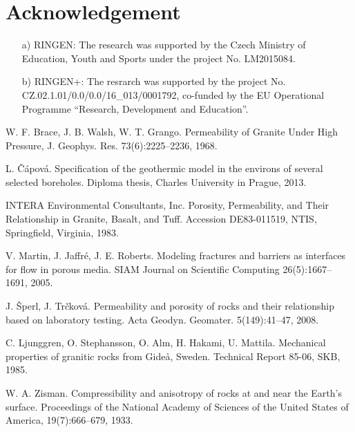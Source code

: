 \documentclass{article}
\begin{document}
\section*{Acknowledgement}
\begin{itemize}
    \item[a)] RINGEN:
    The research was supported by the Czech Ministry of Education, Youth and Sports under the project No. LM2015084.
 
    \item[b)] RINGEN+:
    The resrarch was supported by the project No. CZ.02.1.01/0.0/0.0/16\_013/0001792, co-funded by the EU Operational Programme ``Research, Development and Education''.
\end{itemize}


\begin{thebibliography}{9}

 W. F. Brace,  J. B. Walsh, W. T. Grango.  Permeability of Granite Under High Pressure, J. Geophys. Res. 73(6):2225--2236, 1968.

 L. Čápová. Specification of the geothermic model in the environs of several selected boreholes. Diploma thesis, Charles University in Prague, 2013.

 INTERA Environmental Consultants, Inc. Porosity, Permeability,  and Their  Relationship  in  
Granite,  Basalt, and Tuff. Accession  DE83-011519, NTIS, Springfield, Virginia, 1983.

 V. Martin, J. Jaffré, J. E. Roberts. Modeling fractures and barriers as interfaces for flow in porous media. SIAM Journal on Scientific Computing 26(5):1667--1691, 2005.

 J. Šperl, J. Trčková. Permeability and porosity of rocks and their relationship based on laboratory testing. Acta Geodyn. Geomater. 5(149):41--47, 2008.

 C. Ljunggren, O. Stephansson, O. Alm, H. Hakami, U. Mattila. Mechanical properties of granitic rocks from Gide\aa, Sweden. Technical Report 85-06, SKB, 1985.

 W. A. Zisman. Compressibility and anisotropy of rocks at and near the Earth's surface. Proceedings of the National Academy of Sciences of the United States of America, 19(7):666--679, 1933.

\end{thebibliography}
\end{document}
